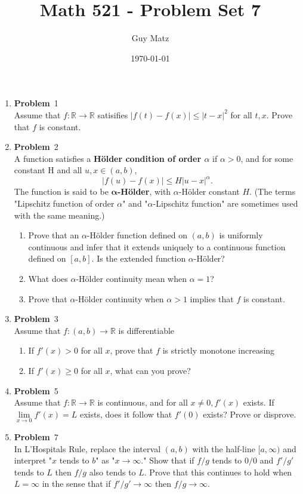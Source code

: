\documentclass[12pt]{amsart}
\title{\textbf{Math 521 - Problem Set 7}}
\author{Guy Matz}
\date{\today}
\newcommand{\benu}{\begin{enumerate}}
\newcommand{\eenu}{\end{enumerate}}
\theoremstyle{definition}
\newcommand{\mbR}{\mathbb{R}}
\newcommand{\itep}{\item {\bfseries Problem}\ }
\begin{document}
 

\maketitle

\begin{enumerate}[series=p]
\itep 1\\
Assume that $f : \mbR \to \mbR$ satisifies $|f(t) - f(x)| \leq |t - x|^2$ for all $t, x$.  Prove that $f$ is constant.

\newpage

\itep 2\\
A function satisfies a \textbf{H\"{o}lder condition of order $\alpha$} if $\alpha > 0$, and for some constant H and all $u, x \in (a,b)$,
$$|f(u) - f(x)| \leq H|u - x|^{\alpha}.$$
The function is said to be $\mathbf{\alpha}$\textbf{-H\"{o}lder}, with $\alpha$-H\"{o}lder constant $H$.  (The terms "Lipschitz function of order $\alpha$" and "$\alpha$-Lipschitz function" are sometimes used with the same meaning.)
	\benu
		\item Prove that an $\alpha$-H\"{o}lder function defined on $(a,b)$ is uniformly continuous and infer that it extends uniquely to a continuous function defined on $[a,b]$.  Is the extended function $\alpha$-H\"{o}lder?
		\item What does $\alpha$-H\"{o}lder continuity mean when $\alpha = 1$?
		\item Prove that $\alpha$-H\"{o}lder continuity when $\alpha> 1$ implies that $f$ is constant.
	\eenu
\newpage

\itep 3\\
Assume that $f:(a,b) \to \mbR$ is differentiable
	\benu
		\item If $f'(x) > 0$ for all $x$, prove that $f$ is strictly monotone increasing
		\item If $f'(x) \geq 0$ for all $x$, what can you prove?
	\eenu

\newpage

\itep 5\\
Assume that $f: \mbR \to \mbR$ is continuous, and for all $x \neq 0, f'(x)$ exists.  If $\lim\limits_{x \to 0} f'(x) = L$ exists, does it follow that $f'(0)$ exists?  Prove or disprove.

\newpage
\itep 7\\
In L'Hospitals Rule, replace the interval $(a,b)$ with the half-line $[a, \infty)$ and interpret "$x$ tends to $b$" as "$x \to \infty$."  Show that if $f/g$ tends to $0/0$ and $f'/g'$ tends to $L$ then $f/g$ also tends to $L$.  Prove that this continues to hold when $L = \infty$ in the sense that if $f'/g' \to \infty$ then $f/g \to \infty$.


\end{enumerate}
\end{document}
